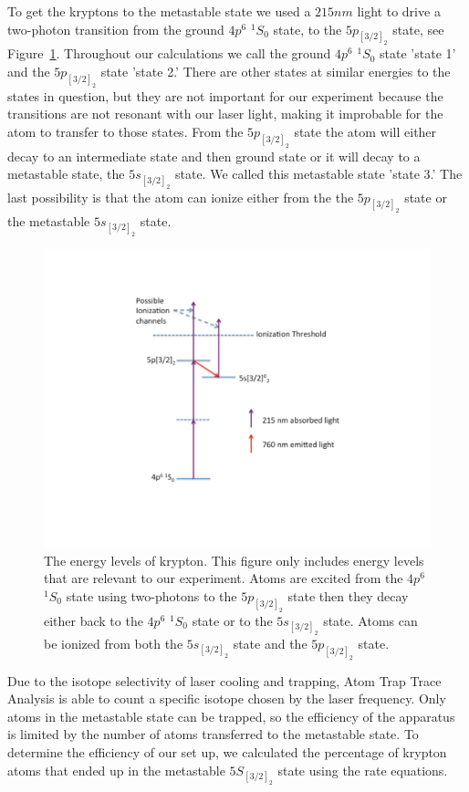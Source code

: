 \documentclass[prb,preprint]{revtex4-1}
\begin{document}
To get the kryptons to the metastable state we used a $215 nm$ light to drive a two-photon transition from the ground $4p^6$ $^1S_0$ state, to the $5p_{[3/2]_2}$ state, see Figure~\ref{KrEnergyLevels}. Throughout our calculations we call the ground $4p^6$ $^1S_0$ state 'state 1' and the $5p_{[3/2]_2}$ state 'state 2.' There are other states at similar energies to the states in question, but they are not important for our experiment because the transitions are not resonant with our laser light, making it improbable for the atom to transfer to those states. From the $5p_{[3/2]_2}$ state the atom will either decay to an intermediate state and then ground state or it will decay to a metastable state, the $5s_{[3/2]_2}$ state. We called this metastable state 'state 3.' The last possibility is that the atom can ionize either from the the $5p_{[3/2]_2}$ state or the metastable $5s_{[3/2]_2}$ state. 

\begin{figure}[h!]
\centering
\includegraphics[width=6in]{KrEnergyLevels.pdf}
\caption{The energy levels of krypton. This figure only includes energy levels that are relevant to our experiment. Atoms are excited from the $4p^6$ $^1S_0$ state using two-photons to the $5p_{[3/2]_2}$ state then they decay either back to the $4p^6$ $^1S_0$ state or to the $5s_{[3/2]_2}$ state. Atoms can be ionized from both the $5s_{[3/2]_2}$ state and the $5p_{[3/2]_2}$ state.}
\label{KrEnergyLevels}
\end{figure}

Due to the isotope selectivity of laser cooling and trapping, Atom Trap Trace Analysis is able to count a specific isotope chosen by the laser frequency.  Only atoms in the metastable state can be trapped, so the efficiency of the apparatus is limited by the number of atoms transferred to the metastable state. To determine the efficiency of our set up, we calculated the percentage of krypton atoms that ended up in the metastable $5S_{[3/2]_2}$ state using the rate equations.
\end{document}

